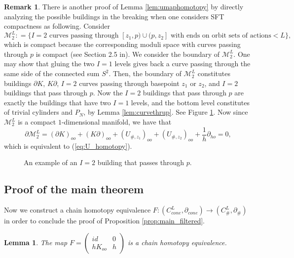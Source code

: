 \documentclass{article}
\numberwithin{equation}{section}
\newtheorem{lemma}[theorem]{Lemma}
\theoremstyle{definition}
\newtheorem{remark}[theorem]{Remark}
\begin{document}
\begin{remark}
There is another proof of Lemma \ref{lem:umaphomotopy} by directly analyzing the possible buildings in the breaking when one considers SFT compactness as following. Consider 
$$\mathcal{M}_2^L: = \{I=2 \text{ curves passing through } [z_1, p) \cup (p, z_2] \text{ with ends on orbit sets of actions} < L\},$$ 
which is compact because the corresponding moduli space with curves passing through $p$ is compact (see Section 2.5 in\cite{HT_weinstein}). We consider the boundary of $\mathcal{M}_2^L$. One may show that gluing the two $I=1$ levels gives back a curve passing through the same side of the connected sum $S^2$. Then, the boundary of $\mathcal{M}_2^L$ constitutes buildings $\partial K$, $K \partial$, $I = 2$ curves passing through basepoint $z_1$ or $z_2$, and $I = 2$ buildings that pass through $p$. Now the $I=2$ buildings that pass through $p$ are exactly the buildings that have two $I=1$ levels, and the bottom level constitutes of trivial cylinders and $P_N$, by Lemma \ref{lem:curvethrup}. See Figure \ref{fig:Ubuilding}. Now since $\mathcal{M}_2^L$ is a compact $1$-dimensional manifold, we have that 
$$\partial \mathcal{M}_2^L = (\partial K)_{oo} + (K\partial)_{oo} + (U_{\#, z_1})_{oo} + (U_{\#, z_2})_{oo} + \frac{1}{h} \partial_{ho} = 0,$$
which is equivalent to (\ref{eq:U_homotopy}).
\end{remark}


\begin{figure}
    \centering
%    
    
    \caption{An example of an $I = 2$ building that passes through $p$.}
    \label{fig:Ubuilding}
\end{figure}





\subsection{Proof of the main theorem}
\label{sec:proof_of_main}
Now we construct a chain homotopy equivalence $F: (C_{cone}^L, \partial_{cone})\to (C_\#^L, \partial_\#)$ in order to conclude the proof of Proposition \ref{prop:main_filtered}. 

\begin{lemma}
\label{lem:f_chain_homotopy_equivalence}
The map $F = \begin{pmatrix}
id & 0\\
hK_{oo} & h
\end{pmatrix}$ is a chain homotopy equivalence.
\end{lemma}
\end{document}
